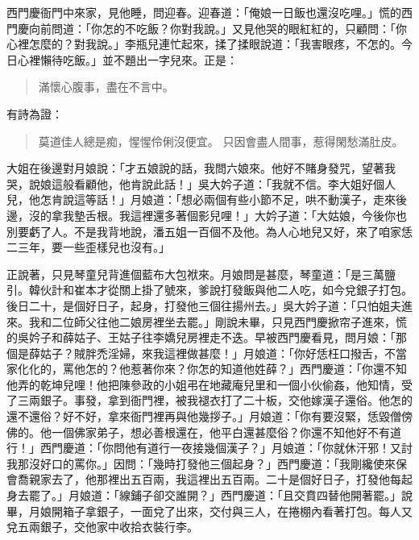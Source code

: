 西門慶衙門中來家，見他睡，問迎春。迎春道：「俺娘一日飯也還沒吃哩。」慌的西門慶向前問道：「你怎的不吃飯？你對我說。」又見他哭的眼紅紅的，只顧問：「你心裡怎麼的？對我說。」李瓶兒連忙起來，揉了揉眼說道：「我害眼疼，不怎的。今日心裡懶待吃飯。」並不題出一字兒來。正是：
\begin{quote}
滿懷心腹事，盡在不言中。
\end{quote}
有詩為證：
\begin{quote}
莫道佳人總是痴，惺惺伶俐沒便宜。
只因會盡人間事，惹得閑愁滿肚皮。
\end{quote}

大姐在後邊對月娘說：「才五娘說的話，我問六娘來。他好不賭身發咒，望著我哭，說娘這般看顧他，他肯說此話！」吳大妗子道：「我就不信。李大姐好個人兒，他怎肯說這等話！」月娘道：「想必兩個有些小節不足，哄不動漢子，走來後邊，沒的拿我墊舌根。我這裡還多著個影兒哩！」大妗子道：「大姑娘，今後你也別要虧了人。不是我背地說，潘五姐一百個不及他。為人心地兒又好，來了咱家恁二三年，要一些歪樣兒也沒有。」

正說著，只見琴童兒背進個藍布大包袱來。月娘問是甚麼，琴童道：「是三萬鹽引。韓伙計和崔本才從關上掛了號來，爹說打發飯與他二人吃，如今兌銀子打包。後日二十，是個好日子，起身，打發他三個往揚州去。」吳大妗子道：「只怕姐夫進來。我和二位師父往他二娘房裡坐去罷。」剛說未畢，只見西門慶掀帘子進來，慌的吳妗子和薛姑子、王姑子往李嬌兒房裡走不迭。早被西門慶看見，問月娘：「那個是薛姑子？賊胖禿淫婦，來我這裡做甚麼！」月娘道：「你好恁枉口撥舌，不當家化化的，罵他怎的？他惹著你來？你怎的知道他姓薛？」西門慶道：「你還不知他弄的乾坤兒哩！他把陳參政的小姐弔在地藏庵兒里和一個小伙偷姦，他知情，受了三兩銀子。事發，拿到衙門裡，被我褪衣打了二十板，交他嫁漢子還俗。他怎的還不還俗？好不好，拿來衙門裡再與他幾拶子。」月娘道：「你有要沒緊，恁毀僧傍佛的。他一個佛家弟子，想必善根還在，他平白還甚麼俗？你還不知他好不有道行！」西門慶道：「你問他有道行一夜接幾個漢子？」月娘道：「你就休汗邪！又討我那沒好口的罵你。」因問：「幾時打發他三個起身？」西門慶道：「我剛纔使來保會喬親家去了，他那裡出五百兩，我這裡出五百兩。二十是個好日子，打發他每起身去罷了。」月娘道：「線鋪子卻交誰開？」西門慶道：「且交賁四替他開著罷。」說畢，月娘開箱子拿銀子，一面兌了出來，交付與三人，在捲棚內看著打包。每人又兌五兩銀子，交他家中收拾衣裝行李。

